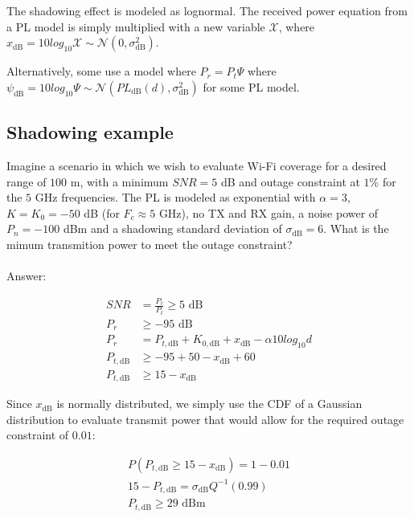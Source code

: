 \documentclass[12pt]{report} %
\begin{document}
The shadowing effect is modeled as lognormal. The received power equation from a
\gls{PL} model is simply multiplied with a new variable $\mathcal{X}$, where
$x_{\text{dB}} = 10 log_{10}{\mathcal{X}} \sim
  \mathcal{N}(0,\sigma_{\text{dB}}^2)$.

Alternatively, some use a model where $P_r = P_t \Psi$ where $ \psi_{\text{dB}}
  = 10 log_{10}{\Psi}  \sim \mathcal{N}(PL_{\text{dB}}(d),\sigma_{\text{dB}}^2)$
for some \gls{PL} model.

\begin{mdframed}
  \subsection*{Shadowing example}
  Imagine a scenario in which we wish to evaluate Wi-Fi coverage for a desired
  range of $100$ m, with a minimum $SNR = 5$ dB and outage constraint at $1\%$ for
  the $5$ GHz frequencies. The \gls{PL} is modeled as exponential with $\alpha =
    3$, $K = K_0 = -50$ dB (for $F_c \approx 5$ GHz), no TX and RX gain, a noise
  power of $P_n = -100$ dBm and a shadowing standard deviation of
  $\sigma_{\text{dB}} = 6$. What is the mimum transmition power to meet the outage
  constraint?
  \\
  \\
  Answer:

  \begin{align}
    SNR             & = \frac{P_r}{P_t} \geq 5 \text{ dB} \nonumber                                       \\
    P_r             & \geq -95 \text{ dB} \nonumber                                                       \\
    P_r             & = P_{t,\text{dB}} + K_{0,\text{dB}} + x_{\text{dB}} - \alpha 10 log_{10}d \nonumber \\
    P_{t,\text{dB}} & \geq -95 + 50 - x_{\text{dB}} + 60 \nonumber                                        \\
    P_{t,\text{dB}} & \geq 15 - x_{\text{dB}} \nonumber
  \end{align}

  Since $x_{\text{dB}}$ is normally distributed, we simply use the CDF of a
  Gaussian distribution to evaluate transmit power that would allow for the
  required outage constraint of $0.01$:

  \begin{align}
    P(P_{t,\text{dB}} \geq  15 - x_{\text{dB}}) = 1 - 0.01 \nonumber \\
    15 - P_{t,\text{dB}} = \sigma_{\text{dB}}Q^{-1}(0.99) \nonumber  \\
    P_{t,\text{dB}} \geq 29 \text{ dBm} \nonumber
  \end{align}
\end{mdframed}
\end{document}
